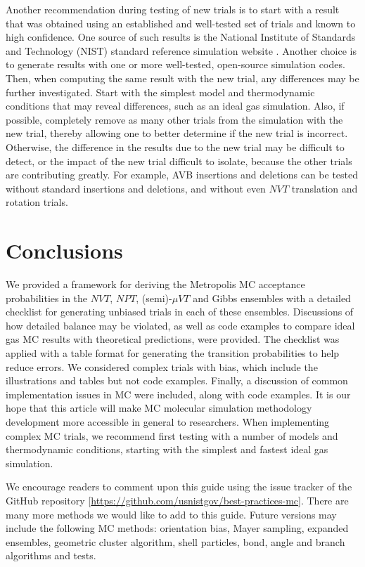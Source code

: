 \documentclass[
  9pt,
  bestpractices,
]{livecoms}
\begin{document}
Another recommendation during testing of new trials is to start with a result that was obtained using an established and well-tested set of trials and known to high confidence.
One source of such results is the National Institute of Standards and Technology (NIST) standard reference simulation website \cite{shen_nist_2017}.
Another choice is to generate results with one or more well-tested, open-source simulation codes.
Then, when computing the same result with the new trial, any differences may be further investigated.
Start with the simplest model and thermodynamic conditions that may reveal differences, such as an ideal gas simulation.
Also, if possible, completely remove as many other trials from the simulation with the new trial, thereby allowing one to better determine if the new trial is incorrect.
Otherwise, the difference in the results due to the new trial may be difficult to detect, or the impact of the new trial difficult to isolate, because the other trials are contributing greatly.
For example, AVB insertions and deletions can be tested without standard insertions and deletions, and without even $NVT$ translation and rotation trials.

\section{\label{sec:conc}Conclusions}

We provided a framework for deriving the Metropolis MC acceptance probabilities in the $NVT$, $NPT$, (semi)-$\mu VT$ and Gibbs ensembles with a detailed checklist for generating unbiased trials in each of these ensembles.
Discussions of how detailed balance may be violated, as well as code examples to compare ideal gas MC results with theoretical predictions, were provided.
The checklist was applied with a table format for generating the transition probabilities to help reduce errors.
We considered complex trials with bias, which include the illustrations and tables but not code examples.
Finally, a discussion of common implementation issues in MC were included, along with code examples.
It is our hope that this article will make MC molecular simulation methodology development more accessible in general to researchers.
When implementing complex MC trials, we recommend first testing with a number of models and thermodynamic conditions, starting with the simplest and fastest ideal gas simulation.

We encourage readers to comment upon this guide using the issue tracker of the GitHub repository [\url{https://github.com/usnistgov/best-practices-mc}].
There are many more methods we would like to add to this guide.
Future versions may include the following MC methods: orientation bias, Mayer sampling, expanded ensembles, geometric cluster algorithm, shell particles, bond, angle and branch algorithms and tests.
\end{document}
